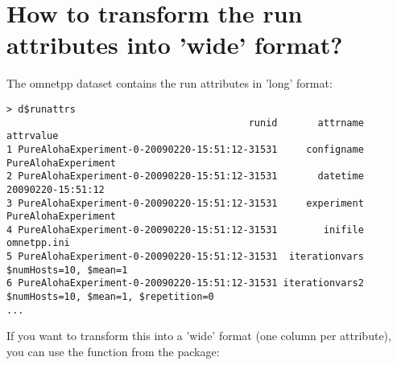 \section{How to transform the run attributes into 'wide' format?}

The omnetpp dataset contains the run attributes in 'long' format:

\begin{verbatim}
> d$runattrs
                                          runid       attrname                            attrvalue
1 PureAlohaExperiment-0-20090220-15:51:12-31531     configname                  PureAlohaExperiment
2 PureAlohaExperiment-0-20090220-15:51:12-31531       datetime                    20090220-15:51:12
3 PureAlohaExperiment-0-20090220-15:51:12-31531     experiment                  PureAlohaExperiment
4 PureAlohaExperiment-0-20090220-15:51:12-31531        inifile                          omnetpp.ini
5 PureAlohaExperiment-0-20090220-15:51:12-31531  iterationvars                $numHosts=10, $mean=1
6 PureAlohaExperiment-0-20090220-15:51:12-31531 iterationvars2 $numHosts=10, $mean=1, $repetition=0
...
\end{verbatim}

If you want to transform this into a 'wide' format (one column per attribute),
you can use the  function from the  package:

